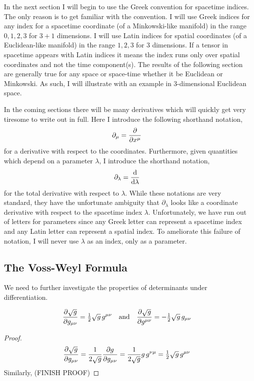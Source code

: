 \documentclass[11pt, a4paper]{article}
\begin{document}
\begin{remark}[Notation]
In the next section I will begin to use the Greek convention for spacetime indices. The only reason is to get familiar with the convention. I will use Greek indices for any index for a spacetime coordinate (of a Minkowski-like manifold) in the range $0, 1, 2, 3$ for $3 + 1$ dimensions. I will use Latin indices for spatial coordinates (of a Euclidean-like manifold) in the range $1, 2, 3$ for $3$ dimensions. If a tensor in spacetime appears with Latin indices it means the index runs only over spatial coordinates and not the time component(s). The results of the following section are generally true for any space or space-time whether it be Euclidean or Minkowski. As such, I will illustrate with an example in 3-dimensional Euclidean space. 
\par
In the coming sections there will be many derivatives which will quickly get very tiresome to write out in full. Here I introduce the following shorthand notation,
\[ \partial_\mu = \frac{\partial{}}{\partial{x^\mu}} \]
for a derivative with respect to the coordinates. Furthermore, given quantities which depend on a parameter $\lambda$, I introduce the shorthand notation,
\[ \partial_\lambda = \frac{\mathrm{d}}{\mathrm{d}\lambda}\]
for the total derivative with respect to $\lambda$. While these notations are very standard, they have the unfortunate ambiguity that $\partial_\lambda$ looks like a coordinate derivative with respect to the spacetime index $\lambda$. Unfortunately, we have run out of letters for parameters since any Greek letter can represent a spacetime index and any Latin letter can represent a spatial index. To ameliorate this failure of notation, I will never use $\lambda$ as an index, only as a parameter. 
\end{remark}

\subsection{The Voss-Weyl Formula}

We need to further investigate the properties of determinants under differentiation.
\begin{lemma}
\[\frac{\partial{\sqrt{g}}}{\partial{g_{\mu \nu}}} = \tfrac{1}{2} \sqrt{g} \, g^{\mu \nu} \quad \text{and} \quad \frac{\partial{\sqrt{g}}}{\partial{g^{\mu \nu}}} = -\tfrac{1}{2} \sqrt{g} \, g_{\mu \nu} \] 
\end{lemma}
\begin{proof}
\[\frac{\partial{\sqrt{g}}}{\partial{g_{\mu \nu}}} = \frac{1}{2 \sqrt{g}} \frac{\partial{g}}{\partial{g_{\mu \nu}}} = \frac{1}{2 \sqrt{g}} g \, g^{\nu \mu} = \tfrac{1}{2} \sqrt{g} \, g^{\mu \nu}\]
Similarly,
(FINISH PROOF)
\end{proof}
\end{document}
